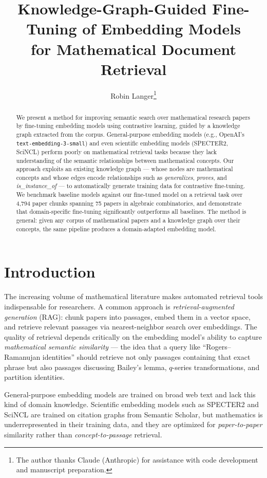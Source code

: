 \documentclass[11pt,a4paper]{article}
\title{Knowledge-Graph-Guided Fine-Tuning of Embedding Models\\
for Mathematical Document Retrieval}
\author{Robin Langer\thanks{The author thanks Claude (Anthropic) for assistance with code development and manuscript preparation.}}
\date{}
\begin{document}
\maketitle

\begin{abstract}
We present a method for improving semantic search over mathematical research
papers by fine-tuning embedding models using contrastive learning, guided by
a knowledge graph extracted from the corpus. General-purpose embedding models
(e.g., OpenAI's \texttt{text-embedding-3-small}) and even scientific embedding
models (SPECTER2, SciNCL) perform poorly on mathematical retrieval tasks because
they lack understanding of the semantic relationships between mathematical
concepts. Our approach exploits an existing knowledge graph --- whose nodes are
mathematical concepts and whose edges encode relationships such as
\emph{generalizes}, \emph{proves}, and \emph{is\_instance\_of} --- to
automatically generate training data for contrastive fine-tuning. We benchmark
baseline models against our fine-tuned model on a retrieval task over 4,794
paper chunks spanning 75 papers in algebraic combinatorics, and demonstrate
that domain-specific fine-tuning significantly outperforms all baselines.
The method is general: given any corpus of mathematical papers and a
knowledge graph over their concepts, the same pipeline produces a
domain-adapted embedding model.
\end{abstract}


\section{Introduction}

The increasing volume of mathematical literature makes automated retrieval
tools indispensable for researchers. A common approach is
\emph{retrieval-augmented generation} (RAG): chunk papers into passages, embed
them in a vector space, and retrieve relevant passages via nearest-neighbor
search over embeddings. The quality of retrieval depends critically on the
embedding model's ability to capture \emph{mathematical semantic similarity}
--- the idea that a query like ``Rogers--Ramanujan identities'' should retrieve
not only passages containing that exact phrase but also passages discussing
Bailey's lemma, $q$-series transformations, and partition identities.

General-purpose embedding models are trained on broad web text and lack this
kind of domain knowledge. Scientific embedding models such as SPECTER2
\cite{specter2} and SciNCL \cite{scincl} are trained on citation graphs from
Semantic Scholar, but mathematics is underrepresented in their training data,
and they are optimized for \emph{paper-to-paper} similarity rather than
\emph{concept-to-passage} retrieval.
\end{document}
